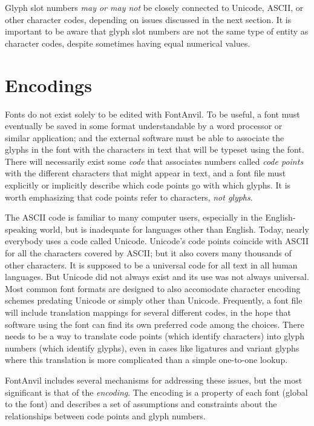\documentclass[11pt]{report}
\begin{document}
Glyph slot numbers \emph{may or may not} be closely connected to Unicode,
ASCII, or other character codes, depending on issues discussed in the next
section.  It is important to be aware that glyph slot numbers are not the
same type of entity as character codes, despite sometimes having equal
numerical values.

\section{Encodings}

Fonts do not exist solely to be edited with FontAnvil.  To be useful, a font
must eventually be saved in some format understandable by a word processor
or similar application; and the external software must be able to associate
the glyphs in the font with the characters in text that will be typeset
using the font.  There will necessarily exist some \emph{code} that
associates numbers called \emph{code points} with the different characters
that might appear in text, and a font file must explicitly or implicitly
describe which code points go with which glyphs.  It is worth emphasizing
that code points refer to characters, \emph{not glyphs}.

The ASCII code is familiar to many computer users, especially in the
English-speaking world, but is inadequate for languages other than English. 
Today, nearly everybody uses a code called Unicode.  Unicode's code points
coincide with ASCII for all the characters covered by ASCII; but it also
covers many thousands of other characters.  It is supposed to be a universal
code for all text in all human languages.  But Unicode did not always exist and its use was not always
universal.  Most common font formats are designed to also accomodate
character encoding schemes predating Unicode or simply other than Unicode. 
Frequently, a font file will include translation mappings for several
different codes, in the hope that software using the font can find its own
preferred code among the choices.  There needs to be a way to translate code
points (which identify characters) into glyph numbers (which identify
glyphs), even in cases like ligatures and variant glyphs where this
translation is more complicated than a simple one-to-one lookup.

FontAnvil includes several mechanisms for addressing these issues, but the
most significant is that of the \emph{encoding}.  The encoding is a
property of each font (global to the font) and describes a set of
assumptions and constraints about the relationships between code points and
glyph numbers.
\end{document}
